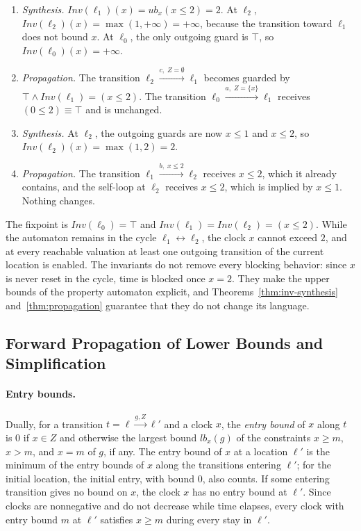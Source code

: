\begin{enumerate}
\item \emph{Synthesis.}  $\mathit{Inv}(\ell_1)(x)=\mathit{ub}_x(x\le2)=2$.  At
$\ell_2$, $\mathit{Inv}(\ell_2)(x)=\max(1,+\infty)=+\infty$, because the
transition toward $\ell_1$ does not bound $x$.  At $\ell_0$, the only outgoing
guard is $\top$, so $\mathit{Inv}(\ell_0)(x)=+\infty$.

\item \emph{Propagation.}  The transition
$\ell_2\xrightarrow{c,\;Z=\emptyset}\ell_1$ becomes guarded by
$\top\wedge\mathit{Inv}(\ell_1)=(x\le2)$.  The transition
$\ell_0\xrightarrow{a,\;Z=\{x\}}\ell_1$ receives $(0\le2)\equiv\top$ and is
unchanged.

\item \emph{Synthesis.}  At $\ell_2$, the outgoing guards are now $x\le1$ and
$x\le2$, so $\mathit{Inv}(\ell_2)(x)=\max(1,2)=2$.

\item \emph{Propagation.}  The transition $\ell_1\xrightarrow{b,\;x\le2}\ell_2$
receives $x\le2$, which it already contains, and the self-loop at $\ell_2$
receives $x\le2$, which is implied by $x\le1$.  Nothing changes.
\end{enumerate}
The fixpoint is $\mathit{Inv}(\ell_0)=\top$ and
$\mathit{Inv}(\ell_1)=\mathit{Inv}(\ell_2)=(x\le2)$.  While the automaton
remains in the cycle $\ell_1\leftrightarrow\ell_2$, the clock $x$ cannot exceed
$2$, and at every reachable valuation at least one outgoing transition of the
current location is enabled.  The invariants do not remove every blocking
behavior: since $x$ is never reset in the cycle, time is blocked once $x=2$.
They make the upper bounds of the property automaton explicit, and
Theorems~\ref{thm:inv-synthesis} and~\ref{thm:propagation} guarantee that they
do not change its language.

\subsection{Forward Propagation of Lower Bounds and Simplification}
\label{sec:forward}
\paragraph{Entry bounds.}
Dually, for a transition $t=\ell\xrightarrow{g,Z}\ell'$ and a clock $x$, the
\emph{entry bound} of $x$ along $t$ is $0$ if $x\in Z$ and otherwise the
largest bound $\mathit{lb}_x(g)$ of the constraints $x\ge m$, $x>m$, and $x=m$
of $g$, if any.  The entry bound of $x$ at a location $\ell'$ is the minimum of
the entry bounds of $x$ along the transitions entering $\ell'$; for the initial
location, the initial entry, with bound $0$, also counts.  If some entering
transition gives no bound on $x$, the clock $x$ has no entry bound at $\ell'$.
Since clocks are nonnegative and do not decrease while time elapses, every
clock with entry bound $m$ at $\ell'$ satisfies $x\ge m$ during every stay in
$\ell'$.

